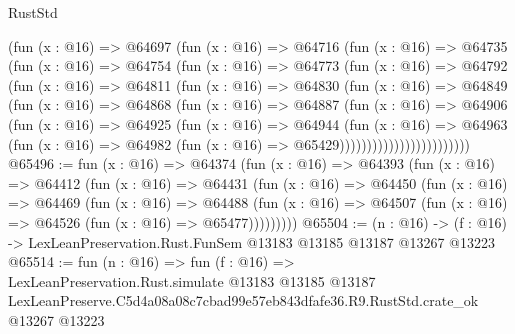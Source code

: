 \begin{lexlean}{RustStd}
\begin{coremodule}
                  (fun (x : @16) =>
                  @64697
                    (fun (x : @16) =>
                    @64716
                      (fun (x : @16) =>
                      @64735
                        (fun (x : @16) =>
                        @64754
                          (fun (x : @16) =>
                          @64773
                            (fun (x : @16) =>
                            @64792
                              (fun (x : @16) =>
                              @64811
                                (fun (x : @16) =>
                                @64830
                                  (fun (x : @16) =>
                                  @64849
                                    (fun (x : @16) =>
                                    @64868
                                      (fun (x : @16) =>
                                      @64887
                                        (fun (x : @16) =>
                                        @64906
                                          (fun (x : @16) =>
                                          @64925
                                            (fun (x : @16) =>
                                            @64944
                                              (fun (x : @16) =>
                                              @64963
                                                (fun (x : @16) =>
                                                @64982
                                                  (fun (x : @16) => @65429))))))))))))))))))))))))
@65496 := fun (x : @16) =>
  @64374
    (fun (x : @16) =>
    @64393
      (fun (x : @16) =>
      @64412
        (fun (x : @16) =>
        @64431
          (fun (x : @16) =>
          @64450
            (fun (x : @16) =>
            @64469
              (fun (x : @16) =>
              @64488
                (fun (x : @16) => @64507 (fun (x : @16) => @64526 (fun (x : @16) => @65477)))))))))
@65504 := (n : @16) ->
  (f : @16) -> LexLeanPreservation.Rust.FunSem @13183 @13185 @13187 @13267 @13223
@65514 := fun (n : @16) =>
  fun (f : @16) =>
  LexLeanPreservation.Rust.simulate
    @13183
    @13185
    @13187
    LexLeanPreserve.C5d4a08a08c7cbad99e57eb843dfafe36.R9.RustStd.crate_ok
    @13267
    @13223
\end{coremodule}
\end{lexlean}

